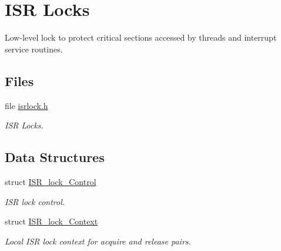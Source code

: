 \hypertarget{group__RTEMSScoreISRLocks}{}\section{I\+SR Locks}
\label{group__RTEMSScoreISRLocks}


Low-\/level lock to protect critical sections accessed by threads and interrupt service routines.  


\subsection*{Files}
\begin{DoxyCompactItemize}
\item 
file \mbox{\hyperlink{isrlock_8h}{isrlock.\+h}}
\begin{DoxyCompactList}\small\item\em I\+SR Locks. \end{DoxyCompactList}\end{DoxyCompactItemize}
\subsection*{Data Structures}
\begin{DoxyCompactItemize}
\item 
struct \mbox{\hyperlink{structISR__lock__Control}{I\+S\+R\+\_\+lock\+\_\+\+Control}}
\begin{DoxyCompactList}\small\item\em I\+SR lock control. \end{DoxyCompactList}\item 
struct \mbox{\hyperlink{structISR__lock__Context}{I\+S\+R\+\_\+lock\+\_\+\+Context}}
\begin{DoxyCompactList}\small\item\em Local I\+SR lock context for acquire and release pairs. \end{DoxyCompactList}\end{DoxyCompactItemize}
